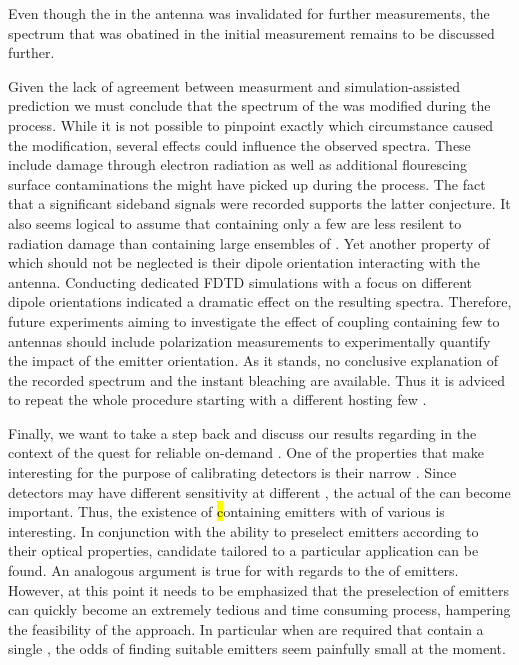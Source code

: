    Even though the \nd in the antenna was invalidated for further measurements, the spectrum that was obatined in the initial measurement remains to be discussed further.

   Given the lack of agreement between measurment and simulation-assisted prediction we must conclude that the spectrum of the \nd was modified during the \pp process. While it is not possible to pinpoint exactly which circumstance caused the modification, several effects could influence the observed spectra. These include damage through electron radiation as well as additional flourescing surface contaminations the \nd might have picked up during the \pp process. The fact that a significant sideband signals were recorded supports the latter conjecture. It also seems logical to assume that \nds containing only a few \sivs are less resilent to radiation damage than \nds containing large ensembles of \sivs.
   Yet another property of \sivs which should not be neglected is their dipole orientation interacting with the antenna. Conducting dedicated FDTD simulations with a focus on different dipole orientations indicated a dramatic effect on the resulting spectra. Therefore, future experiments aiming to investigate the effect of coupling \nds containing few \sivs to antennas should include polarization measurements to experimentally quantify the impact of the emitter orientation. As it stands, no conclusive explanation of the recorded spectrum and the instant bleaching are available. Thus it is adviced to repeat the whole procedure starting with a different \nd hosting few \sivs.


   Finally, we want to take a step back and discuss our results regarding \sivs in the context of the quest for reliable on-demand \sps. One of the properties that make \sivs interesting \spss for the purpose of calibrating detectors is their narrow \lw \zpl. Since detectors may have different sensitivity at different \wl, the actual \wl of the \zpl can become important. Thus, the existence of \hl containing emitters with \zpls of various \wls is interesting.
   In conjunction with the ability to preselect emitters according to their optical properties, candidate \nds tailored to a particular application can be found. An analogous argument is true for \vl with regards to the \cwl of emitters. However, at this point it needs to be emphasized that the preselection of emitters can quickly become an extremely tedious and time consuming process, hampering the feasibility of the approach. In particular when \nds are required that contain a single \siv, the odds of finding suitable emitters seem painfully small at the moment.

